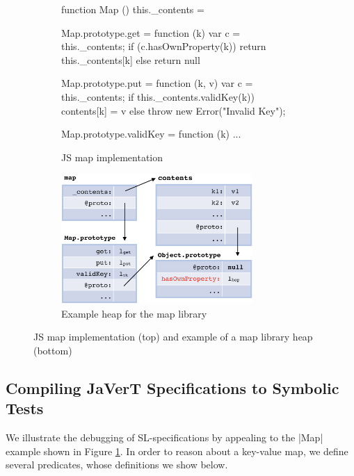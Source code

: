  \begin{figure}[t!]
 \begin{subfigure}{\linewidth}
 \begin{lstjs}[firstnumber=1]
function Map () { this._contents = {} }

Map.prototype.get = function (k) {
  var c = this._contents;
  if (c.hasOwnProperty(k)) {
    return this._contents[k] 
  } else { return null }
}

Map.prototype.put = function (k, v) {
  var c = this._contents;
  if this._contents.validKey(k)) {  
    contents[k] = v   
  } else
    throw new Error("Invalid Key");
} 

Map.prototype.validKey = function (k) { ... }
\end{lstjs}
\caption{JS map implementation}
\end{subfigure}

\begin{subfigure}{\linewidth}
\centering
\includegraphics[width=0.8\textwidth]{figures/mapDiagram.png}
\caption{Example heap for the map library}
\end{subfigure}
\caption{JS map implementation (top) and example of a map library heap (bottom) \label{map:example}}
\end{figure}

\subsection{Compiling JaVerT Specifications to Symbolic Tests} 
\label{specs:example}

We illustrate the debugging of SL-specifications by appealing to the \jsinline|Map| example shown in Figure \ref{map:example}. In order to reason about a key-value map,
we define several predicates, whose definitions we show below.

